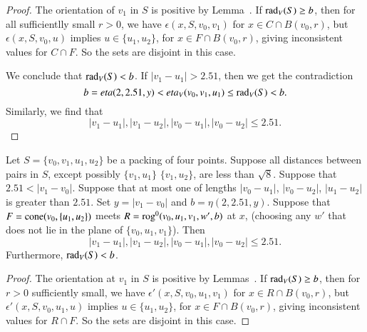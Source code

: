 \begin{tarskidata}
\begin{tarski}
\begin{proof}  
The orientation
of $v_1$ in $S$ is positive by Lemma~.
 If $\operatorname{rad}_V(S)\ge b$, then for all sufficientlly small $r>0$, we have
$\epsilon(x,S,v_0,v_1)$ for $x\in C\cap B(v_0,r)$, 
but $\epsilon(x,S,v_0,u)$ implies $u\in\{u_1,u_2\}$,
for $x\in F\cap B(v_0,r)$, giving inconsistent values for $C\cap F$.  So
the sets are disjoint in this case.  

We conclude that $\operatorname{rad}_V(S) < b$.
If $|v_1-u_1| > 2.51$, then we get the contradiction
$$b = eta(2,2.51,y) < eta_V(v_0,v_1,u_1)\le \operatorname{rad}_V(S) < b.$$
Similarly, we find that
   $$
   |v_1-u_1|,|v_1-u_2|,|v_0-u_1|,|v_0-u_2| \le 2.51.
   $$
\end{proof}
\end{tarski}





\begin{tarski}

\begin{lemma}
 Let $S=\{v_0,v_1,u_1,u_2\}$ be a packing of four points.
Suppose all distances between pairs in $S$, except possibly $\{v_1,u_1\}$
$\{v_1,u_2\}$, are
less than $\sqrt8$.
Suppose that $2.51 < |v_1-v_0|$.
Suppose that at most one of lengths $|v_0-u_1|$,
$|v_0-u_2|$, $|u_1-u_2|$ is greater than $2.51$.
%
Set $y=|v_1-v_0|$ and $b=\eta(2,2.51,y)$.
Suppose that $F={\operatorname{cone}}(v_0,\{u_1,u_2\})$ meets
$R={\operatorname{rog}}^0(v_0,u_1,v_1,w',b)$ at $x$, (choosing any $w'$ that
does not lie in the plane of $\{v_0,u_1,v_1\}$).
Then 
  $$
  |v_1-u_1|,|v_1-u_2|,|v_0-u_1|,|v_0-u_2|\le 2.51.
  $$
Furthermore, $\operatorname{rad}_V(S) < b$. 
\end{lemma}

\begin{proof}  
The orientation
at $v_1$ in $S$ is positive by Lemmas~.
If $\operatorname{rad}_V(S)\ge b$, then for $r>0$ sufficiently small, we have
$\epsilon'(x,S,v_0,u_1,v_1)$ for $x\in R\cap B(v_0,r)$, 
but $\epsilon'(x,S,v_0,u_1,u)$ implies $u\in\{u_1,u_2\}$,
for $x\in F\cap B(v_0,r)$, giving inconsistent values for $R\cap F$.  So
the sets are disjoint in this case.  


\end{proof}
\end{tarski}
\end{tarskidata}
